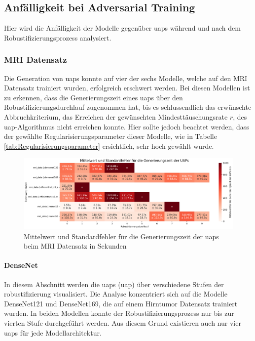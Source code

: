 \subsection{Anfälligkeit bei Adversarial Training}
Hier wird die Anfälligkeit der Modelle gegenüber \acrshort{uap}s während und nach dem Robustifizierungsprozess analysiert. 

\subsubsection{MRI Datensatz}
Die Generation von \acrshort{uap}s konnte auf vier der sechs Modelle, welche auf den MRI Datensatz trainiert wurden, erfolgreich erschwert werden. Bei diesen Modellen ist zu erkennen, dass die Generierungszeit eines \acrshort{uap}s über den Robustifizierungsdurchlauf zugenommen hat, bis es schlussendlich das erwünschte Abbruchkriterium, das Erreichen der gewünschten Mindesttäuschungsrate $r$, des \acrshort{uap}-Algorithmus nicht erreichen konnte. Hier sollte jedoch beachtet werden, dass der gewählte Regularisierungsparameter dieser Modelle, wie in Tabelle \ref{tab:Regularisierungsparameter}
ersichtlich, sehr hoch gewählt wurde. 

\begin{figure}[H]
    \centering
    \includegraphics[width=\linewidth]{01-images/05-resultate/Generieungszeit MRI.png}
    \caption{Mittelwert und Standardfehler für die Generierungszeit der \acrshort{uap}s beim MRI Datensatz in Sekunden}
    \label{fig:GenerierungszeitUAPsMRI}
\end{figure}

\paragraph{DenseNet}
In diesem Abschnitt werden die \acrlong{uap}s (\acrshort{uap}) über verschiedene Stufen der \Gls{robustifizierung} visualisiert. Die Analyse konzentriert sich auf die Modelle DenseNet121 und DenseNet169, die auf einem Hirntumor Datensatz trainiert wurden. In beiden Modellen konnte der Robustifizierungsprozess nur bis zur vierten Stufe durchgeführt werden. Aus diesem Grund existieren auch nur vier \acrshort{uap}s für jede Modellarchitektur.

